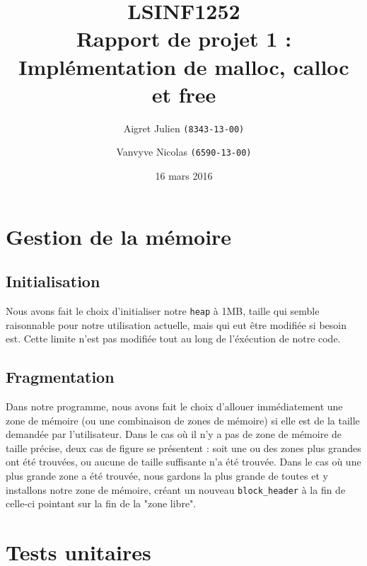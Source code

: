 \documentclass[10pt,a4paper]{article}
\author{Aigret Julien \texttt{(8343-13-00)}\and Vanvyve Nicolas \texttt{(6590-13-00)}}
\date{16 mars 2016}
\title{LSINF1252\\Rapport de projet 1 :\\Implémentation de malloc, calloc et free}
\begin{document}
\maketitle

\section{Gestion de la mémoire}
\subsection{Initialisation}
Nous avons fait le choix d'initialiser notre \texttt{heap} à 1MB, taille qui semble raisonnable pour notre utilisation actuelle, mais qui eut être modifiée si besoin est. Cette limite n'est pas modifiée tout au long de l'éxécution de notre code.

\subsection{Fragmentation}
Dans notre programme, nous avons fait le choix d'allouer immédiatement une zone de mémoire (ou une combinaison de zones de mémoire) si elle est de la taille demandée par l'utilisateur. Dans le cas où il n'y a pas de zone de mémoire de taille précise, deux cas de figure se présentent : soit une ou des zones plus grandes ont été trouvées, ou aucune de taille suffisante n'a été trouvée. Dans le cas où une plus grande zone a été trouvée, nous gardons la plus grande de toutes et y installons notre zone de mémoire, créant un nouveau \texttt{block\_header} à la fin de celle-ci pointant sur la fin de la "zone libre".


\section{Tests unitaires}
\end{document}
